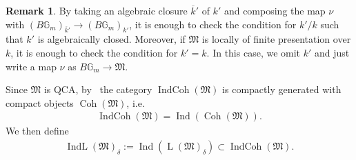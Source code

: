 \documentclass [11pt,oneside,a4paper,mathscr]{amsart}
\theoremstyle{definition}
\newtheorem{remark}[thm]{Remark}
\newcommand{\LL}{\operatorname{L}}
\newcommand{\bgm}{B\mathbb{G}_m}
\newcommand{\Coh}{\operatorname{Coh}}
\newcommand{\Ind}{\operatorname{Ind}}
\newcommand{\IndCoh}{\operatorname{IndCoh}}
\newcommand{\IndL}{\operatorname{IndL}}
\begin{document}
\begin{remark}\label{rmk:k'}
    By taking an algebraic closure $\overline{k}'$ of $k'$ and 
    composing the map $\nu$ with $(\bgm)_{\overline{k}'}\to (\bgm)_{k'}$, it is enough 
    to check the condition for $k'/k$ such that $k'$ is algebraically closed. Moreover, if 
    $\mathfrak{M}$ is locally of finite presentation over $k$, it is enough to check 
    the condition for $k'=k$. In this case, we omit $k'$ and just write a map $\nu$ as 
    $\bgm\to \mathfrak{M}$.
\end{remark}

Since $\mathfrak{M}$ is QCA, by~\cite{MR3037900} 
the category $\IndCoh(\mathfrak{M})$ is compactly 
generated with compact objects $\Coh(\mathfrak{M})$, i.e. 
\begin{align*}
    \IndCoh(\mathfrak{M})=\Ind(\Coh(\mathfrak{M})). 
\end{align*}
We then define 
\begin{align*}
    \IndL(\mathfrak{M})_{\delta} :=\Ind(\LL(\mathfrak{M})_{\delta}) \subset \IndCoh(\mathfrak{M}). 
\end{align*}
\end{document}
